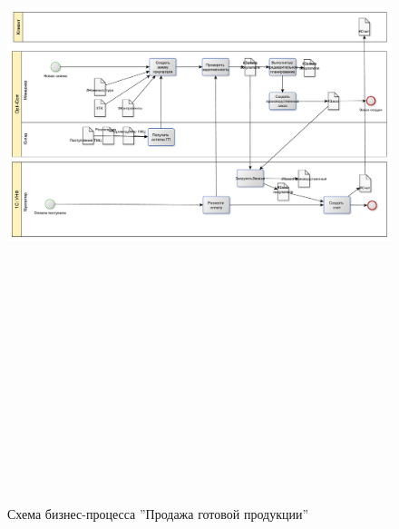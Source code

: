 \begin{figure}[!htb]
\centering
  \includegraphics[width=200mm, height=220mm, angle=90, keepaspectratio]{50_Pics/2 Sales.pdf}
\caption{Схема бизнес-процесса ''Продажа готовой продукции''}
\label{pic:2_Sales}
\end{figure} 

\clearpage


